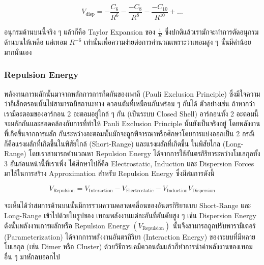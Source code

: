 \begin{equation}
  \label{eq:dispersion_energy_expansion}
  V_{\text{disp}}
  =
  - \frac{C_{6}}{R^{6}}
  - \frac{-C_{8}}{R^{8}}
  - \frac{-C_{10}}{R^{10}}
  + \dots
\end{equation}

\noindent อนุกรมด้านบนนี้จริง ๆ แล้วก็คือ Taylor Expansion ของ $\frac{1}{R}$ ซึ่งปกติแล้วเรามักจะทำการตัดอนุกรมด้านบนให้เหลือ%
แค่เทอม $R^{-6}$ เท่านั้นเพื่อความง่ายต่อการคำนวณเพราะว่าเทอมสูง ๆ นั้นมีค่าน้อยมากนั่นเอง

\subsubsection{Repulsion Energy}

พลังงานการผลักนั้นมาจากหลักการการกีดกันของเพาลี (Pauli Exclusion Principle) ซึ่งมีใจความว่าอิเล็กตรอนนั้นไม่สามารถมีสถานะทาง%
ควอนตัมที่เหมือนกันพร้อม ๆ กันได้ ตัวอย่างเช่น ถ้าหากว่าเรามีอะตอมของอาร์กอน 2 อะตอมอยู่ใกล้ ๆ กัน (เป็นระบบ Closed Shell)
อาร์กอนทั้ง 2 อะตอมนี้จะผลักกันและสอดคล้องกับการที่ทำให้ Pauli Exclusion Principle นั้นยังเป็นจริงอยู่ โดยพลังงานที่เกิดขึ้นจากการผลัก%
กันระหว่างอะตอมนั้นมักจะถูกพิจารณาหรือศึกษาโดยการแบ่งออกเป็น 2 กรณี ก็คือแรงผลักที่เกิดขึ้นในพิสัยใกล้ (Short-Range) และแรงผลักที่เกิดขึ้น%
ในพิสัยไกล (Long-Range) โดยเราสามารถคำนวณหา Repulsion Energy ได้จากการใช้อันตรกิริยาระหว่างโมเลกุลทั้ง 3 อันก่อนหน้านี้ที่เราเพิ่ง%
ได้ศึกษาไปก็คือ Electrostatic, Induction และ Dispersion Forces มาใช้ในการสร้าง Approximation สำหรับ Repulsion Energy
ซึ่งมีสมการดังนี้

\begin{equation}
  V_{\text{Repulsion}}
  =
  V_{\text{Interaction}}
  - V_{\text{Electrostatic}}
  - V_{\text{Induction}}
  V_{\text{Dispersion}}
\end{equation}

\noindent จะเห็นได้ว่าสมการด้านบนนั้นมีการรวมความคลาดเคลื่อนของอันตรกิริยาแบบ Short-Range และ Long-Range เข้าไปด้วยในรูปของ%
เทอมพลังงานแต่ละอันที่อันดับสูง ๆ เช่น Dispersion Energy ดังนั้นพลังงานการผลักหรือ Repulsion Energy $(V_{\text{Repulsion}})$
นั้นจึงสามารถถูกปรับพารามิเตอร์ (Parameterization) ได้จากการพลังงานอันตรกิริยา (Interaction Energy) ของระบบที่มีหลายโมเลกุล
(เช่น Dimer หรือ Cluster) ด้วยวิธีการเคมีควอนตัมแล้วก็ทำการนำค่าพลังงานของเทอมอื่น ๆ มาหักลบออกไป

